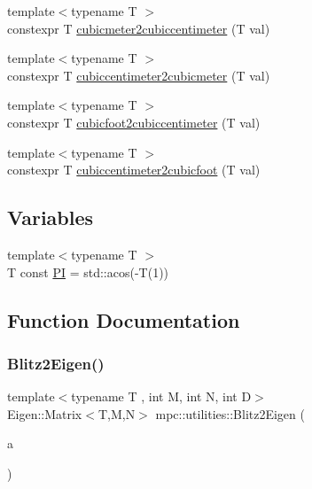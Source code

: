 \begin{DoxyCompactItemize}
{\footnotesize template$<$typename T $>$ }\\constexpr T \mbox{\hyperlink{namespacempc_1_1utilities_a692da73ca8f5b1784035029b4ef88790}{cubicmeter2cubiccentimeter}} (T val)
\item 
{\footnotesize template$<$typename T $>$ }\\constexpr T \mbox{\hyperlink{namespacempc_1_1utilities_a4bff0fd9e5e1ca5607209f7d1f48c4fb}{cubiccentimeter2cubicmeter}} (T val)
\item 
{\footnotesize template$<$typename T $>$ }\\constexpr T \mbox{\hyperlink{namespacempc_1_1utilities_a2e19dbeb14683c7f286d573587ffa3f8}{cubicfoot2cubiccentimeter}} (T val)
\item 
{\footnotesize template$<$typename T $>$ }\\constexpr T \mbox{\hyperlink{namespacempc_1_1utilities_a3dcb46dc0e3f7ff4709e37a0fd2d5b6f}{cubiccentimeter2cubicfoot}} (T val)
\end{DoxyCompactItemize}
\subsection*{Variables}
\begin{DoxyCompactItemize}
\item 
{\footnotesize template$<$typename T $>$ }\\T const \mbox{\hyperlink{namespacempc_1_1utilities_a9ebe3319659192350da76891a61820d0}{PI}} = std\+::acos(-\/T(1))
\end{DoxyCompactItemize}


\subsection{Function Documentation}
\mbox{\label{namespacempc_1_1utilities_afb1a22ab436781cf5a791680bc60988f}} 
\subsubsection{\texorpdfstring{Blitz2\+Eigen()}{Blitz2Eigen()}}
{\footnotesize\ttfamily template$<$typename T , int M, int N, int D$>$ \\
Eigen\+::\+Matrix$<$T,M,N$>$ mpc\+::utilities\+::\+Blitz2\+Eigen (\begin{DoxyParamCaption}\item[{blitz\+::\+Array$<$ T, D $>$ \&}]{a }\end{DoxyParamCaption})}



